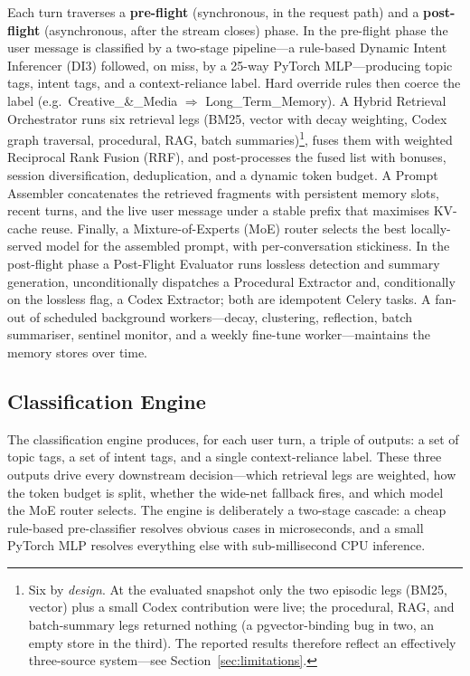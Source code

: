 \documentclass[10pt]{article}
\begin{document}
Each turn traverses a \textbf{pre-flight} (synchronous, in the request path) and a \textbf{post-flight} (asynchronous, after the stream closes) phase. In the pre-flight phase the user message is classified by a two-stage pipeline---a rule-based Dynamic Intent Inferencer (DI3) followed, on miss, by a 25-way PyTorch MLP---producing topic tags, intent tags, and a context-reliance label. Hard override rules then coerce the label (e.g.\ Creative\_\&\_Media $\Rightarrow$ Long\_Term\_Memory). A Hybrid Retrieval Orchestrator runs six retrieval legs (BM25, vector with decay weighting, Codex graph traversal, procedural, RAG, batch summaries)\footnote{Six by \emph{design}. At the evaluated snapshot only the two episodic legs (BM25, vector) plus a small Codex contribution were live; the procedural, RAG, and batch-summary legs returned nothing (a pgvector-binding bug in two, an empty store in the third). The reported results therefore reflect an effectively three-source system---see Section~\ref{sec:limitations}.}, fuses them with weighted Reciprocal Rank Fusion (RRF), and post-processes the fused list with bonuses, session diversification, deduplication, and a dynamic token budget. A Prompt Assembler concatenates the retrieved fragments with persistent memory slots, recent turns, and the live user message under a stable prefix that maximises KV-cache reuse. Finally, a Mixture-of-Experts (MoE) router selects the best locally-served model for the assembled prompt, with per-conversation stickiness. In the post-flight phase a Post-Flight Evaluator runs lossless detection and summary generation, unconditionally dispatches a Procedural Extractor and, conditionally on the lossless flag, a Codex Extractor; both are idempotent Celery tasks. A fan-out of scheduled background workers---decay, clustering, reflection, batch summariser, sentinel monitor, and a weekly fine-tune worker---maintains the memory stores over time.

\subsection{Classification Engine}

The classification engine produces, for each user turn, a triple of outputs: a set of topic tags, a set of intent tags, and a single context-reliance label. These three outputs drive every downstream decision---which retrieval legs are weighted, how the token budget is split, whether the wide-net fallback fires, and which model the MoE router selects. The engine is deliberately a two-stage cascade: a cheap rule-based pre-classifier resolves obvious cases in microseconds, and a small PyTorch MLP resolves everything else with sub-millisecond CPU inference.
\end{document}
